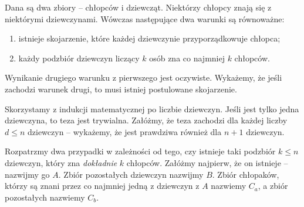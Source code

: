 \newpage


\noindent
Dana są dwa zbiory -- chłopców i dziewcząt. Niektórzy chłopcy znają się z niektórymi dziewczynami. Wówczas następujące dwa warunki są równoważne:
\begin{enumerate}
	\item istnieje skojarzenie, które każdej dziewczynie przyporządkowuje chłopca;
	\item każdy podzbiór dziewczyn liczący $k$ osób zna co najmniej $k$ chłopców.
\end{enumerate}



\vspace{5px}
\noindent
Wynikanie drugiego warunku z pierwszego jest oczywiste. Wykażemy, że jeśli zachodzi warunek drugi, to musi istniej postulowane skojarzenie.

\vspace{10px}
\noindent
Skorzystamy z indukcji matematycznej po liczbie dziewczyn. Jeśli jest tylko jedna dziewczyna, to teza jest trywialna. Załóżmy, że teza zachodzi dla każdej liczby $d \leqslant n$ dziewczyn -- wykażemy, że jest prawdziwa również dla $n + 1$ dziewczyn.

\vspace{10px}
\noindent
Rozpatrzmy dwa przypadki w zależności od tego, czy istnieje taki podzbiór $k \leqslant n$ dziewczyn, który zna \textit{dokładnie} $k$ chłopców. Załóżmy najpierw, że on istnieje -- nazwijmy go $A$. Zbiór pozostałych dziewczyn nazwijmy $B$. Zbiór chłopaków, którzy są znani przez co najmniej jedną z dziewczyn z $A$ nazwiemy $C_a$, a zbiór pozostałych nazwiemy $C_b$.

\begin{center}
\end{center}


